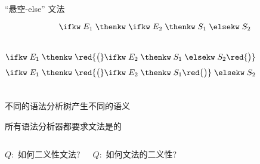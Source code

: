 \begin{frame}{}
  \begin{center}
    ``悬空-else'' 文法
  \end{center}

  \[
    \ifkw\; E_{1} \;\thenkw\; \ifkw\; E_{2} \;\thenkw\; S_{1} \;\elsekw\; S_{2}
  \]

  \pause
  \begin{columns}
      \[
        \ifkw\; E_{1} \;\thenkw\; \red{\big(}\ifkw\; E_{2} \;\thenkw\; S_{1} \;\elsekw\; S_{2}\red{\big)}
      \]
      \[
        \ifkw\; E_{1} \;\thenkw\; \red{\big(}\ifkw\; E_{2} \;\thenkw\; S_{1}\red{\big)} \;\elsekw\; S_{2}
      \]
  \end{columns}
\end{frame}

\begin{frame}{}
  \begin{center}

    \vspace{0.60cm}
    不同的语法分析树产生不同的语义

  \end{center}
\end{frame}

\begin{frame}{}

  \begin{center}
    所有语法分析器都要求文法是的
  \end{center}
\end{frame}

\begin{frame}{}
  \begin{center}
  \end{center}

  \begin{columns}
      \begin{center}
        $Q:$ 如何二义性文法?

      \end{center}
      \begin{center}
        $Q:$ 如何文法的二义性?

      \end{center}
  \end{columns}
\end{frame}

